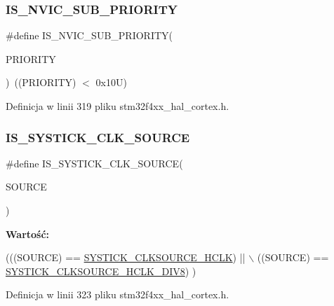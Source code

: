 \subsubsection{\texorpdfstring{I\+S\+\_\+\+N\+V\+I\+C\+\_\+\+S\+U\+B\+\_\+\+P\+R\+I\+O\+R\+I\+TY}{IS\_NVIC\_SUB\_PRIORITY}}
{\footnotesize\ttfamily \#define I\+S\+\_\+\+N\+V\+I\+C\+\_\+\+S\+U\+B\+\_\+\+P\+R\+I\+O\+R\+I\+TY(\begin{DoxyParamCaption}\item[{}]{P\+R\+I\+O\+R\+I\+TY }\end{DoxyParamCaption})~((P\+R\+I\+O\+R\+I\+TY) $<$ 0x10\+U)}



Definicja w linii 319 pliku stm32f4xx\+\_\+hal\+\_\+cortex.\+h.

\mbox{\label{group___c_o_r_t_e_x___private___macros_ga22d6291f6aed29442cf4cd9098fa0784}} 
\subsubsection{\texorpdfstring{I\+S\+\_\+\+S\+Y\+S\+T\+I\+C\+K\+\_\+\+C\+L\+K\+\_\+\+S\+O\+U\+R\+CE}{IS\_SYSTICK\_CLK\_SOURCE}}
{\footnotesize\ttfamily \#define I\+S\+\_\+\+S\+Y\+S\+T\+I\+C\+K\+\_\+\+C\+L\+K\+\_\+\+S\+O\+U\+R\+CE(\begin{DoxyParamCaption}\item[{}]{S\+O\+U\+R\+CE }\end{DoxyParamCaption})}

{\bfseries Wartość\+:}
\begin{DoxyCode}
(((SOURCE) == \hyperlink{group___c_o_r_t_e_x___sys_tick__clock__source_ga6f6582df23b6fbc578325e453b9893b7}{SYSTICK\_CLKSOURCE\_HCLK}) || \(\backslash\)
                                       ((SOURCE) == \hyperlink{group___c_o_r_t_e_x___sys_tick__clock__source_ga1fd9b5bada2a8b2425a8523bc0fc7124}{SYSTICK\_CLKSOURCE\_HCLK\_DIV8})
      )
\end{DoxyCode}


Definicja w linii 323 pliku stm32f4xx\+\_\+hal\+\_\+cortex.\+h.

